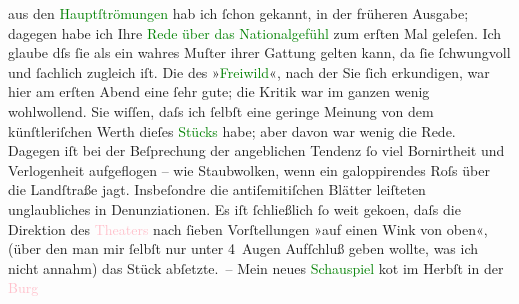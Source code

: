                   \label{K_L00787_1v}\label{K_L00787_1h} aus den \textcolor{green}{Hauptſtrömungen}{}\ledrightnote{\textcolor{green}{Hauptströmungen der Literatur des neunzehnten Jahrhunderts}} hab ich ſchon gekannt, in der
               früheren {\pb}Ausgabe; dagegen habe ich Ihre \textcolor{green}{Rede über das Nationalgefühl}{} zum
               erſten Mal geleſen. Ich glaube dſs ſie als ein wahres Muſter ihrer Gattung gelten
               kann, da ſie ſchwungvoll und ſachlich zugleich iſt.\pend
           \pstart
           Die \label{K_L00787_2v}\label{K_L00787_2h} des »\textcolor{green}{Freiwild}{}\ledrightnote{\textcolor{green}{Freiwild. Schauspiel in 3 Akten}}«,
               nach der Sie ſich erkundigen, war hier am erſten Abend eine ſehr gute; die Kritik war
               im ganzen wenig wohlwollend. Sie wiſſen, daſs ich ſelbſt {\pb}eine geringe Meinung von dem künſtleriſchen Werth
               dieſes \textcolor{green}{Stücks}{} habe; aber davon
               war wenig die Rede. Dagegen  iſt bei der
               Beſprechung der angeblichen Tendenz ſo viel Bornirtheit und Verlogenheit aufgeflogen
               – wie Staubwolken, wenn ein galoppirendes Roſs über die Landſtraße jagt. Insbeſondre
               die antiſemitiſchen Blätter leiſteten unglaubliches in Denunziationen. Es iſt
               ſchließlich ſo weit geko{\geminationm}en, daſs die Direktion {\pb}des \textcolor{pink}{Theaters}{} nach ſieben Vorſtellungen »auf einen Wink von oben«, (über den man
               mir ſelbſt nur unter 4 Augen Aufſchluß geben wollte, was ich nicht annahm) das Stück
               abſetzte. –\pend
           \pstart
           Mein neues \textcolor{green}{Schauspiel}{} ko{\geminationm}t im Herbſt in der \textcolor{pink}{Burg}{}\ledrightnote{\textcolor{pink}{Burgtheater}}
